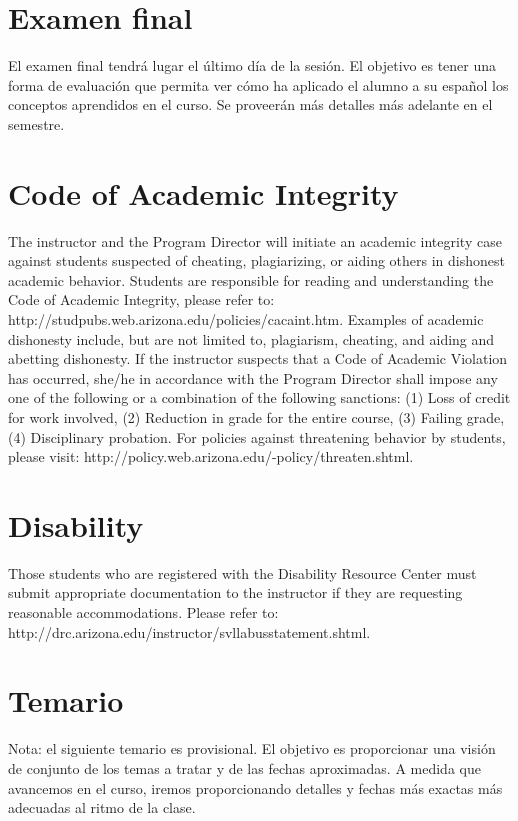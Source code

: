 \documentclass[12pt]{article}
\begin{document}
\section{Examen final}
\begin{singlespace}
\noindent El examen final tendrá lugar el último día de la sesión. El objetivo es tener una forma de evaluación que permita ver cómo ha aplicado el alumno a su español los conceptos aprendidos en el curso. Se proveerán más detalles más adelante en el semestre.
\end{singlespace}

\section*{Code of Academic Integrity}
\begin{singlespace}
\noindent The instructor and the Program Director will initiate an academic integrity case against students suspected of cheating, plagiarizing, or aiding others in dishonest academic behavior. Students are responsible for reading and understanding the Code of Academic Integrity, please refer to: http://studpubs.web.arizona.edu/policies/cacaint.htm. Examples of academic dishonesty include, but are not limited to, plagiarism, cheating, and aiding and abetting dishonesty. If the instructor suspects that a Code of Academic Violation has occurred, she/he in accordance with the Program Director shall impose any one of the following or a combination of the following sanctions: (1) Loss of credit for work involved, (2) Reduction in grade for the entire course, (3) Failing grade, (4) Disciplinary probation. For policies against threatening behavior by students, please visit: http://policy.web.arizona.edu/-policy/threaten.shtml.
\end{singlespace}

\section*{Disability}
\begin{singlespace}
\noindent Those students who are registered with the Disability Resource Center must submit appropriate documentation to the instructor if they are requesting reasonable accommodations. Please refer to: http://drc.arizona.edu/instructor/svllabusstatement.shtml.
\end{singlespace}

\pagebreak

\section*{Temario}
\begin{singlespace}
\noindent Nota: el siguiente temario es provisional. El objetivo es proporcionar una visión de conjunto de los temas a tratar y de las fechas aproximadas. A medida que avancemos en el curso, iremos proporcionando detalles y fechas más exactas más adecuadas al ritmo de la clase.
\end{singlespace}
\end{document}
